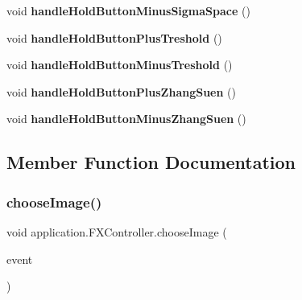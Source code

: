 \begin{DoxyCompactItemize}
\item 
\mbox{\label{classapplication_1_1_f_x_controller_aaccf5b9181abcf9910267c025192c6f0}} 
void {\bfseries handle\+Hold\+Button\+Minus\+Sigma\+Space} ()
\item 
\mbox{\label{classapplication_1_1_f_x_controller_a9420b6b7f80ee23b57c4dc1e988962c3}} 
void {\bfseries handle\+Hold\+Button\+Plus\+Treshold} ()
\item 
\mbox{\label{classapplication_1_1_f_x_controller_a4905ab7c816229eb2d96c0c18838636b}} 
void {\bfseries handle\+Hold\+Button\+Minus\+Treshold} ()
\item 
\mbox{\label{classapplication_1_1_f_x_controller_a1f32e44a7fa8c580e309f8550d833613}} 
void {\bfseries handle\+Hold\+Button\+Plus\+Zhang\+Suen} ()
\item 
\mbox{\label{classapplication_1_1_f_x_controller_aae3654d382b23e12b1c62b69aac1be72}} 
void {\bfseries handle\+Hold\+Button\+Minus\+Zhang\+Suen} ()
\end{DoxyCompactItemize}


\subsection{Member Function Documentation}
\mbox{\label{classapplication_1_1_f_x_controller_a723312c2219263bdfadd98d86186a365}} 
\subsubsection{\texorpdfstring{choose\+Image()}{chooseImage()}}
{\footnotesize\ttfamily void application.\+F\+X\+Controller.\+choose\+Image (\begin{DoxyParamCaption}\item[{Action\+Event}]{event }\end{DoxyParamCaption})}

